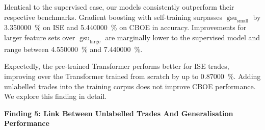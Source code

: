 Identical to the supervised case, our models consistently outperform their respective benchmarks. Gradient boosting with self-training surpasses $\operatorname{gsu}_{\mathrm{small}}$ by \SI{3.350000}{\percent} on \gls{ISE} and \SI{5.440000}{\percent} on \gls{CBOE} in accuracy. Improvements for larger feature sets over $\operatorname{gsu}_{\mathrm{large}}$ are marginally lower to the supervised model and range between \SI{4.550000}{\percent} and \SI{7.440000}{\percent}. 

Expectedly, the pre-trained Transformer performs better for \gls{ISE} trades, improving over the Transformer trained from scratch by up to \SI{0.87000}{\percent}. Adding unlabelled trades into the training corpus does not improve \gls{CBOE} performance. We explore this finding in detail.

\textbf{Finding 5: Link Between Unlabelled Trades And Generalisation Performance}


